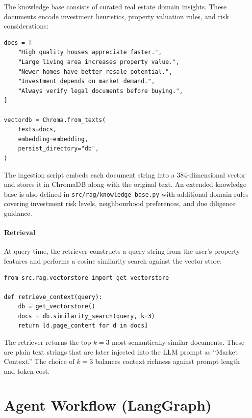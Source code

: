 \documentclass[11pt,a4paper]{article}
\begin{document}
The knowledge base consists of curated real estate domain insights.
These documents encode investment heuristics, property valuation rules, and risk considerations:

\begin{lstlisting}[caption={Knowledge base ingestion (\texttt{src/rag/ingest.py}).}]
docs = [
    "High quality houses appreciate faster.",
    "Large living area increases property value.",
    "Newer homes have better resale potential.",
    "Investment depends on market demand.",
    "Always verify legal documents before buying.",
]

vectordb = Chroma.from_texts(
    texts=docs,
    embedding=embedding,
    persist_directory="db",
)
\end{lstlisting}

The ingestion script embeds each document string into a 384-dimensional vector and stores it in ChromaDB along with the original text.
An extended knowledge base is also defined in \texttt{src/rag/knowledge\_base.py} with additional domain rules covering investment risk levels, neighbourhood preferences, and due diligence guidance.

\subsection{Retrieval}

At query time, the retriever constructs a query string from the user's property features and performs a cosine similarity search against the vector store:

\begin{lstlisting}[caption={Context retrieval (\texttt{src/rag/retriever.py}).}]
from src.rag.vectorstore import get_vectorstore

def retrieve_context(query):
    db = get_vectorstore()
    docs = db.similarity_search(query, k=3)
    return [d.page_content for d in docs]
\end{lstlisting}

The retriever returns the top $k = 3$ most semantically similar documents.
These are plain text strings that are later injected into the LLM prompt as ``Market Context.''
The choice of $k = 3$ balances context richness against prompt length and token cost.

\newpage

\part{Agent Workflow (LangGraph)}
\end{document}
